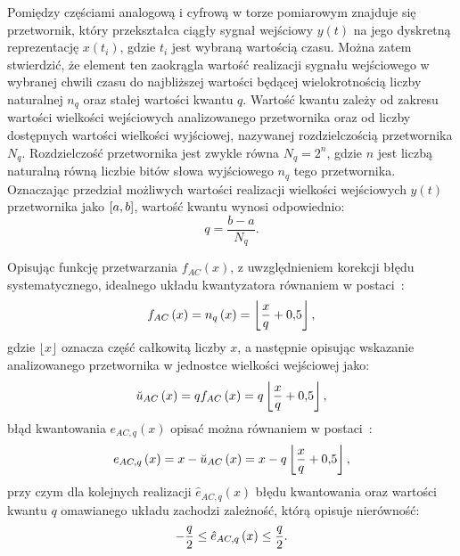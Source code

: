 Pomiędzy częściami analogową i cyfrową w torze pomiarowym znajduje się przetwornik, który przekształca ciągły sygnał wejściowy $y(t)$ na jego dyskretną reprezentację $x(t_{i})$, gdzie $t_{i}$ jest wybraną wartością czasu. Można zatem stwierdzić, że element ten zaokrągla wartość realizacji sygnału wejściowego w wybranej chwili czasu do najbliższej wartości będącej wielokrotnością liczby naturalnej $n_{q}$ oraz stałej wartości kwantu $q$. Wartość kwantu zależy od zakresu wartości wielkości wejściowych analizowanego przetwornika oraz od liczby dostępnych wartości wielkości wyjściowej, nazywanej rozdzielczością przetwornika $N_{q}$. Rozdzielczość przetwornika jest zwykle równa $N_{q} = 2^{n}$, gdzie $n$ jest liczbą naturalną równą liczbie bitów słowa wyjściowego $n_{q}$ tego przetwornika. Oznaczając przedział możliwych wartości realizacji wielkości wejściowych $y(t)$ przetwornika jako $\interval{a}{b}$, wartość kwantu wynosi odpowiednio:
\begin{equation}
q = \frac{b - a}{N_{q}} \label{eq:adc_quant}.
\end{equation}

Opisując funkcję przetwarzania $f_{AC}(x)$, z uwzględnieniem korekcji błędu systematycznego, idealnego układu kwantyzatora równaniem w postaci~\cite{jakubiec_przetwarzanie}:
\begin{equation}
f_{AC} \left(x\right) = n_{q} \left(x\right) = \left\lfloor \frac{x}{q} + \num{0.5} \right\rfloor \label{eq:adc_function},
\end{equation}
gdzie $\lfloor x \rfloor$ oznacza część całkowitą liczby $x$, a następnie opisując wskazanie analizowanego przetwornika w jednostce wielkości wejściowej jako:
\begin{equation}
\breve{u}_{AC} \left(x\right) = q f_{AC} \left(x\right) = q \left\lfloor \frac{x}{q} + \num{0.5} \right\rfloor \label{eq:adc_output},
\end{equation}
błąd kwantowania $e_{AC,q}(x)$ opisać można równaniem w postaci~\cite{jakubiec_przetwarzanie}:
\begin{equation}
e_{AC,q} \left(x\right) = x - \breve{u}_{AC} \left(x\right) = x - q \left\lfloor \frac{x}{q} + \num{0.5} \right\rfloor \label{eq:adc_qerror},
\end{equation}
przy czym dla kolejnych realizacji $\hat{e}_{AC,q}(x)$ błędu kwantowania oraz wartości kwantu $q$ omawianego układu zachodzi zależność, którą opisuje nierówność:
\begin{equation}
-\frac{q}{2} \le \hat{e}_{AC,q} \left(x\right) \le \frac{q}{2} \label{eq:adc_qerrrange}.
\end{equation}

